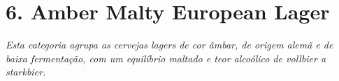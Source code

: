 \section*{6. Amber Malty European Lager}
\textit{Esta categoria agrupa as cervejas lagers de cor âmbar, de origem alemã e de baixa fermentação, com um equilíbrio maltado e teor alcoólico de vollbier a starkbier.}

